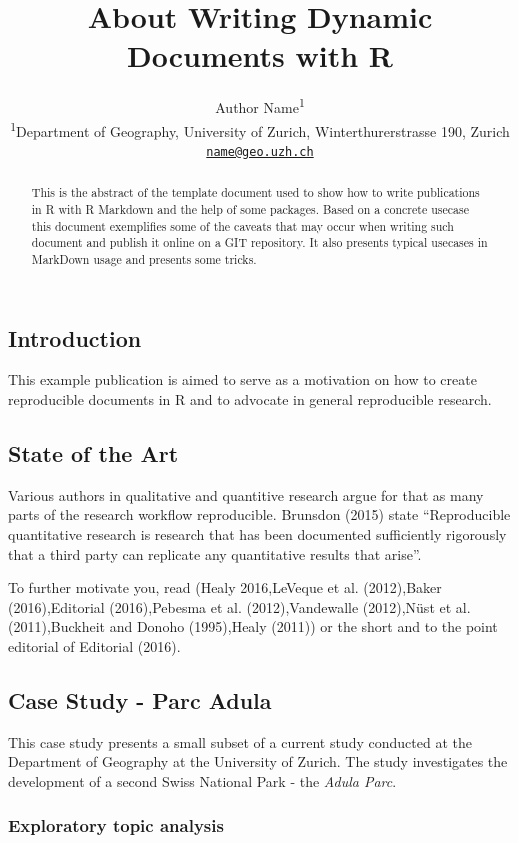 \documentclass[]{article}
\title{About Writing Dynamic Documents with R}
\author{Author Name\textsuperscript{1} \\ \textsuperscript{1}Department of Geography, University of Zurich,
Winterthurerstrasse 190, Zurich \\ \href{mailto:name@geo.uzh.ch}{\nolinkurl{name@geo.uzh.ch}}}
\date{}
\begin{document}
\maketitle
\begin{abstract}
This is the abstract of the template document used to show how to write
publications in R with R Markdown and the help of some packages. Based
on a concrete usecase this document exemplifies some of the caveats that
may occur when writing such document and publish it online on a GIT
repository. It also presents typical usecases in MarkDown usage and
presents some tricks.
\end{abstract}

\subsection{Introduction}\label{introduction}

This example publication is aimed to serve as a motivation on how to
create reproducible documents in R and to advocate in general
reproducible research.

\subsection{State of the Art}\label{state-of-the-art}

Various authors in qualitative and quantitive research argue for that as
many parts of the research workflow reproducible. Brunsdon (2015) state
``Reproducible quantitative research is research that has been
documented sufficiently rigorously that a third party can replicate any
quantitative results that arise''.

To further motivate you, read (Healy 2016,LeVeque et al. (2012),Baker
(2016),Editorial (2016),Pebesma et al. (2012),Vandewalle (2012),Nüst et
al. (2011),Buckheit and Donoho (1995),Healy (2011)) or the short and to
the point editorial of Editorial (2016).

\subsection{Case Study - Parc Adula}\label{case-study---parc-adula}

This case study presents a small subset of a current study conducted at
the Department of Geography at the University of Zurich. The study
investigates the development of a second Swiss National Park - the
\emph{Adula Parc}.

\subsubsection{Exploratory topic
analysis}\label{exploratory-topic-analysis}
\end{document}
